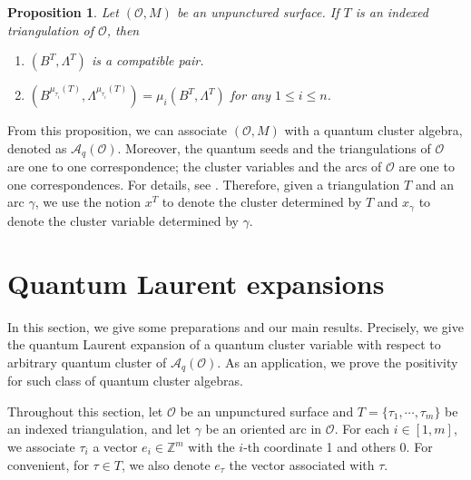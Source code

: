 \documentclass[10pt]{amsart}
\theoremstyle{theorems}
\newtheorem{Proposition}[Theorem]{Proposition}
\begin{document}
\medskip

\begin{Proposition}\cite{M}\label{compatible}
Let $(\mathcal O, M)$ be an unpunctured surface. If $T$ is an indexed triangulation of $\mathcal O$, then

\begin{enumerate}[$(1)$]

  \item $(B^T, \Lambda^T)$ is a compatible pair.

  \item $(B^{\mu_{\tau_i}(T)},\Lambda^{\mu_{\tau_i}(T)})=\mu_i(B^T, \Lambda^T)$ for any $1\leq i\leq n$.

\end{enumerate}

\end{Proposition}

\medskip

From this proposition, we can associate $(\mathcal O, M)$ with a quantum cluster algebra, denoted as $\mathcal A_q(\mathcal O)$. Moreover, the quantum seeds and the triangulations of $\mathcal O$ are one to one correspondence; the cluster variables and the arcs of $\mathcal O$ are one to one correspondences. For details, see \cite{M}. Therefore, given a triangulation $T$ and an arc $\gamma$, we use the notion $x^{T}$ to denote the cluster determined by $T$ and $x_{\gamma}$ to denote the cluster variable determined by $\gamma$.

\section{Quantum Laurent expansions}\label{qle}

In this section, we give some preparations and our main results. Precisely, we give the quantum Laurent expansion of a quantum cluster variable with respect to arbitrary quantum cluster of $\mathcal A_q(\mathcal O)$. As an application, we prove the positivity for such class of quantum cluster algebras.

\medskip

Throughout this section, let $\mathcal O$ be an unpunctured surface and $T=\{\tau_1,\cdots,\tau_m\}$ be an indexed triangulation, and let $\gamma$ be an oriented arc in $\mathcal O$. For each $i\in [1,m]$, we associate $\tau_i$ a vector $e_i\in \mathbb Z^m$ with the $i$-th coordinate 1 and others 0. For convenient, for $\tau\in T$, we also denote $e_{\tau}$ the vector associated with $\tau$.
\end{document}
